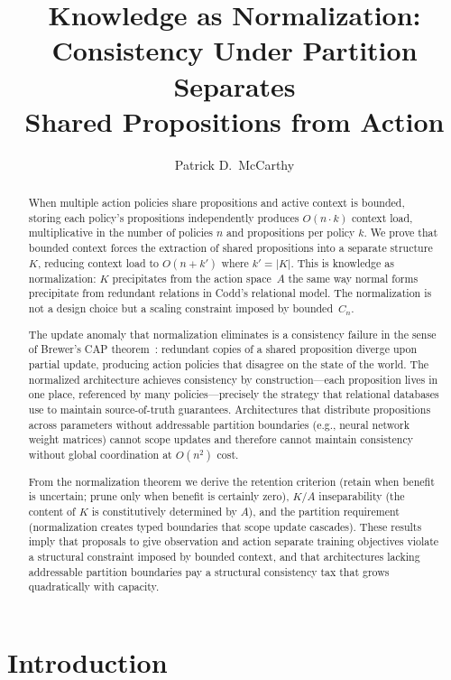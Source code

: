 \documentclass[11pt]{article}
\title{Knowledge as Normalization:\\Consistency Under Partition Separates\\Shared Propositions from Action}
\author{Patrick D.\ McCarthy}
\date{}
\theoremstyle{definition}
\theoremstyle{remark}
\begin{document}
\maketitle

\begin{abstract}
When multiple action policies share propositions and active context is
bounded, storing each policy's propositions independently produces
$O(n \cdot k)$ context load, multiplicative in the number of policies
$n$ and propositions per policy $k$. We prove that bounded context
forces the extraction of shared propositions into a separate
structure~$K$, reducing context load to $O(n + k')$ where $k' = |K|$.
This is knowledge as normalization: $K$ precipitates from the action
space~$A$ the same way normal forms precipitate from redundant
relations in Codd's relational model. The normalization is not a
design choice but a scaling constraint imposed by bounded~$C_n$.

The update anomaly that normalization eliminates is a consistency
failure in the sense of Brewer's CAP theorem~\cite{Brewer2000}: redundant copies of a shared
proposition diverge upon partial update, producing action policies
that disagree on the state of the world. The normalized architecture
achieves consistency by construction---each proposition lives in one
place, referenced by many policies---precisely the strategy that
relational databases use to maintain source-of-truth guarantees.
Architectures that distribute propositions across parameters without
addressable partition boundaries (e.g., neural network weight
matrices) cannot scope updates and therefore cannot maintain
consistency without global coordination at $O(n^2)$ cost.

From the normalization theorem we derive the retention criterion
(retain when benefit is uncertain; prune only when benefit is
certainly zero), $K/A$ inseparability (the content of $K$ is
constitutively determined by $A$), and the partition requirement
(normalization creates typed boundaries that scope update cascades).
These results imply that proposals to give observation and action separate
training objectives violate a structural constraint imposed by bounded context,
and that architectures lacking addressable partition boundaries pay
a structural consistency tax that grows quadratically with capacity.
\end{abstract}

\section{Introduction}
\label{sec:intro}
\end{document}
